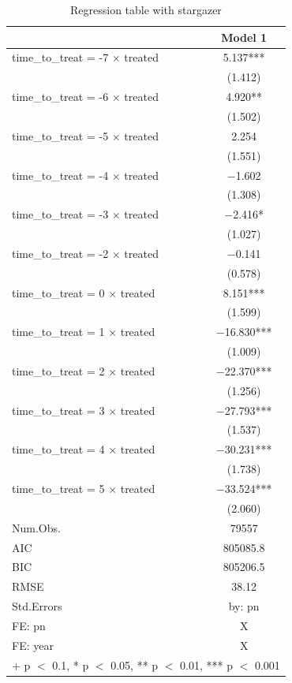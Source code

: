 \documentclass[
]{article}
\begin{document}
\begin{table}

\caption{\label{tab:table-4}Regression table with stargazer}
\centering
\begin{tabular}[t]{lc}
\toprule
  & Model 1\\
\midrule
time\_to\_treat = -7 × treated & \num{5.137}***\\
 & (\num{1.412})\\
time\_to\_treat = -6 × treated & \num{4.920}**\\
 & (\num{1.502})\\
time\_to\_treat = -5 × treated & \num{2.254}\\
 & (\num{1.551})\\
time\_to\_treat = -4 × treated & \num{-1.602}\\
 & (\num{1.308})\\
time\_to\_treat = -3 × treated & \num{-2.416}*\\
 & (\num{1.027})\\
time\_to\_treat = -2 × treated & \num{-0.141}\\
 & (\num{0.578})\\
time\_to\_treat = 0 × treated & \num{8.151}***\\
 & (\num{1.599})\\
time\_to\_treat = 1 × treated & \num{-16.830}***\\
 & (\num{1.009})\\
time\_to\_treat = 2 × treated & \num{-22.370}***\\
 & (\num{1.256})\\
time\_to\_treat = 3 × treated & \num{-27.793}***\\
 & (\num{1.537})\\
time\_to\_treat = 4 × treated & \num{-30.231}***\\
 & (\num{1.738})\\
time\_to\_treat = 5 × treated & \num{-33.524}***\\
 & (\num{2.060})\\
\midrule
Num.Obs. & \num{79557}\\
AIC & \num{805085.8}\\
BIC & \num{805206.5}\\
RMSE & \num{38.12}\\
Std.Errors & by: pn\\
FE: pn & X\\
FE: year & X\\
\bottomrule
\multicolumn{2}{l}{\rule{0pt}{1em}+ p $<$ 0.1, * p $<$ 0.05, ** p $<$ 0.01, *** p $<$ 0.001}\\
\end{tabular}
\end{table}
\end{document}

